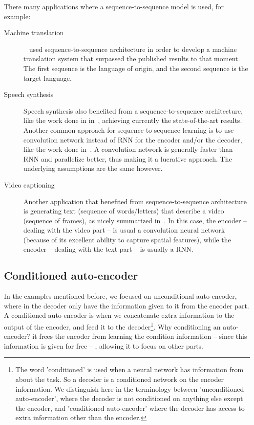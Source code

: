     \par There many applications where a sequence-to-sequence model is used, for example:
    \begin{description}
      \item [Machine translation]~\citep{sutskever2014sequence} used sequence-to-sequence architecture in order to develop a machine translation system that surpassed the published results to that moment. The first sequence is the language of origin, and the second sequence is the target language.
      \item [Speech synthesis] Speech synthesis also benefited from a sequence-to-sequence architecture, like the work done in in~\citep{oord2016wavenet,wang2017tacotron}, achieving currently the state-of-the-art results. Another common approach for sequence-to-sequence learning is to use convolution network instead of RNN for the encoder and/or the decoder, like the work done in~\citep{ping2017deep}. A convolution network is generally faster than RNN and parallelize better, thus making it a lucrative approach. The underlying assumptions are the same however.
      \item [Video captioning] Another application that benefited from sequence-to-sequence architecture is generating text (sequence of words/letters) that describe a video (sequence of frames), as nicely summarized in~\citep{aafaq2018video}. In this case, the encoder -- dealing with the video part -- is usual a convolution neural network (because of its excellent ability to capture spatial features), while the encoder -- dealing with the text part -- is usually a RNN.
    \end{description}

  \subsection{Conditioned auto-encoder}
    \par In the examples mentioned before, we focused on unconditional auto-encoder, where in the decoder only have the information given to it from the encoder part. A conditioned auto-encoder is when we concatenate extra information to the output of the encoder, and feed it to the decoder\footnote{The word 'conditioned' is used when a neural network has information from about the task. So a decoder is a conditioned network on the encoder information. We distinguish here in the terminology between 'unconditioned auto-encoder', where the decoder is not conditioned on anything else except the encoder, and 'conditioned auto-encoder' where the decoder has access to extra information other than the encoder.}. Why conditioning an auto-encoder? it frees the encoder from learning the condition information -- since this information is given for free -- , allowing it to focus on other parts.

